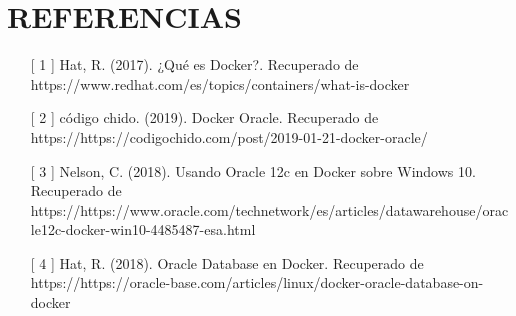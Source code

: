 \section{REFERENCIAS} 

\begin{itemize}
	\item [[ 1]] Hat, R. (2017). ¿Qué es Docker?. Recuperado de https://www.redhat.com/es/topics/containers/what-is-docker
	\item [[ 2]] código chido. (2019). Docker Oracle. Recuperado de https://https://codigochido.com/post/2019-01-21-docker-oracle/
         \item [[ 3]] Nelson, C. (2018). Usando Oracle 12c en Docker sobre Windows 10. Recuperado de https://https://www.oracle.com/technetwork/es/articles/datawarehouse/oracle12c-docker-win10-4485487-esa.html
         \item [[ 4]] Hat, R. (2018). Oracle Database en Docker. Recuperado de https://https://oracle-base.com/articles/linux/docker-oracle-database-on-docker
\end{itemize}


